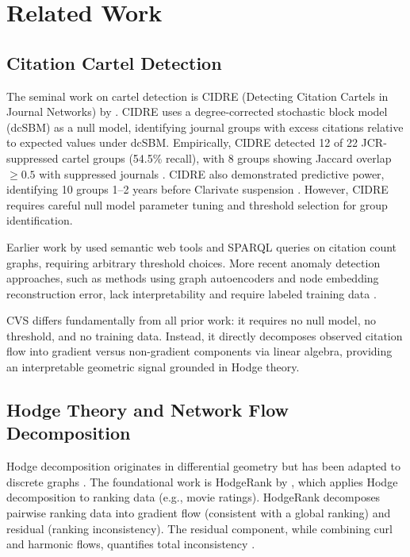 \documentclass[11pt,letterpaper]{article}
\begin{document}
\section{Related Work}

\subsection{Citation Cartel Detection}

The seminal work on cartel detection is CIDRE (Detecting Citation Cartels in Journal Networks) by \citet{Kojaku2021}. CIDRE uses a degree-corrected stochastic block model (dcSBM) as a null model, identifying journal groups with excess citations relative to expected values under dcSBM. Empirically, CIDRE detected 12 of 22 JCR-suppressed cartel groups (54.5\% recall), with 8 groups showing Jaccard overlap $\geq 0.5$ with suppressed journals \citep{Kojaku2021}. CIDRE also demonstrated predictive power, identifying 10 groups 1--2 years before Clarivate suspension \citep{Kojaku2021}. However, CIDRE requires careful null model parameter tuning and threshold selection for group identification.

Earlier work by \citet{PerezEsparrells2016} used semantic web tools and SPARQL queries on citation count graphs, requiring arbitrary threshold choices. More recent anomaly detection approaches, such as methods using graph autoencoders and node embedding reconstruction error, lack interpretability and require labeled training data \citep{Lazaridou2020}.

CVS differs fundamentally from all prior work: it requires no null model, no threshold, and no training data. Instead, it directly decomposes observed citation flow into gradient versus non-gradient components via linear algebra, providing an interpretable geometric signal grounded in Hodge theory.

\subsection{Hodge Theory and Network Flow Decomposition}

Hodge decomposition originates in differential geometry but has been adapted to discrete graphs \citep{Jiang2011, Lim2024}. The foundational work is HodgeRank by \citet{Jiang2011}, which applies Hodge decomposition to ranking data (e.g., movie ratings). HodgeRank decomposes pairwise ranking data into gradient flow (consistent with a global ranking) and residual (ranking inconsistency). The residual component, while combining curl and harmonic flows, quantifies total inconsistency \citep{Jiang2011}.
\end{document}
